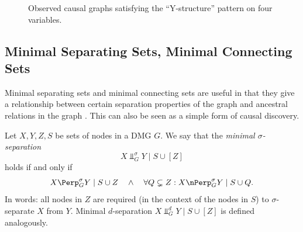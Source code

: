 \begin{figure}
\hfill
  \caption{Observed causal graphs satisfying the ``Y-structure'' pattern on four variables.
  \label{fig:Ystruct}}
\end{figure}

\subsection{Minimal Separating Sets, Minimal Connecting Sets}

Minimal separating sets and minimal connecting sets are useful in that they give a relationship between
certain separation properties of the graph and ancestral relations in the graph \cite{SMR1999,ClaassenHeskes2011}.
This can also be seen as a simple form of causal discovery.

\begin{Def}\label{def:min_sep}
Let $X,Y,Z,S$ be sets of nodes in a DMG $G$. 
We say that the \emph{minimal $\sigma$-separation}
  $$X \Perp_{G}^\sigma Y \mid S \cup [Z]$$
holds if and only if
  $$X \Perp_{G}^\sigma Y \mid S \cup Z \quad\land\quad \forall Q \subsetneq Z: X \nPerp_G^\sigma Y \mid S \cup Q.$$
In words: all nodes in $Z$ are required (in the context of the nodes in $S$) to $\sigma$-separate $X$ from $Y$.
Minimal $d$-separation $X \Perp_{G}^d Y \mid S \cup [Z]$ is defined analogously.
\end{Def}

